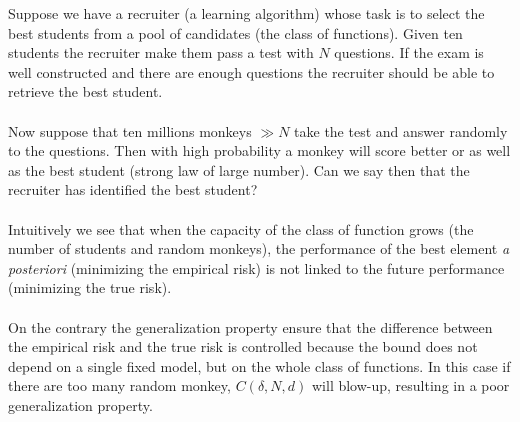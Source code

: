 \begin{example}
    Suppose we have a recruiter (a learning algorithm) whose task is to select 
    the best students from a pool of candidates (the class of functions).
    Given ten students the recruiter make them pass a test with $N$ questions.
    If the exam is well constructed and there are enough questions the
    recruiter should be able to retrieve the best student.
    \paragraph{}
    Now suppose that ten millions monkeys $\gg N$ take the test and answer
    randomly to the questions. Then with high probability a monkey will score
    better or as well as the best student (strong law of large number). Can we
    say then that the recruiter has identified the best
    student?
    \paragraph{}
    Intuitively we see that when the capacity of the class of function grows
    (the number of students and random monkeys), the performance of the best
    element \emph{a posteriori} (minimizing the empirical risk) is not linked
    to the future performance (minimizing the true risk).
    \paragraph{}
    On the contrary the generalization property ensure that the difference
    between the empirical risk and the true risk is controlled because the bound
    does not depend on a single fixed model, but on the whole class of
    functions. In this case if there are too many random monkey, $C(\delta,
    N, d)$ will blow-up, resulting in a poor generalization property.
\end{example}
